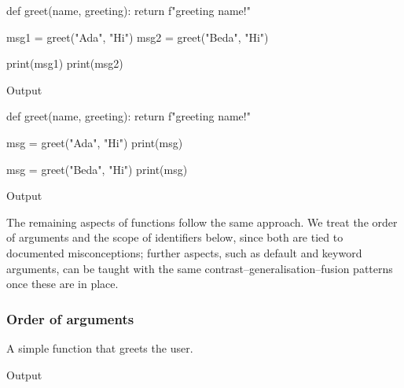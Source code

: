 \begin{description}
    \begin{frame}[fragile]
    \begin{minipage}[t]{0.45\columnwidth}
      \begin{pyblock}[funcG2]
def greet(name, greeting):
  return f"{greeting} {name}!"

msg1 = greet("Ada", "Hi")
msg2 = greet("Beda", "Hi")

print(msg1)
print(msg2)
      \end{pyblock}

      \begin{block}{Output}\printpythontex[verbatim]\end{block}
    \end{minipage}
    \hfill
    \begin{minipage}[t]{0.45\columnwidth}
      \begin{pyblock}[funcG2]
def greet(name, greeting):
  return f"{greeting} {name}!"

msg = greet("Ada", "Hi")
print(msg)

msg = greet("Beda", "Hi")
print(msg)
      \end{pyblock}

      \begin{block}{Output}\printpythontex[verbatim]\end{block}
    \end{minipage}
    \end{frame}

\end{description}

The remaining aspects of functions follow the same approach. We treat the order
of arguments and the scope of identifiers below, since both are tied to
documented misconceptions; further aspects, such as default and keyword
arguments, can be taught with the same contrast--generalisation--fusion patterns
once these are in place.

\subsubsection{Order of arguments}

\begin{frame}[fragile]\label{vtprogord}
  \begin{example}
    A simple function that greets the user.
  \end{example}

  \begin{block}{Output}
  \end{block}
\end{frame}

